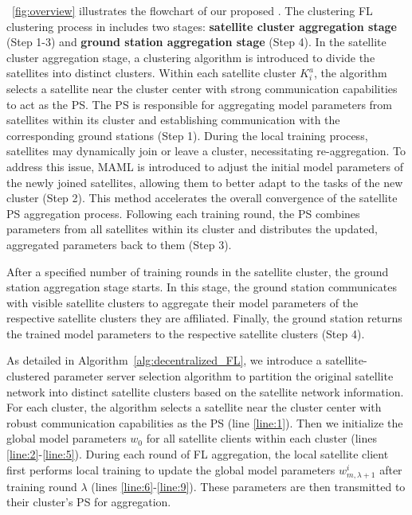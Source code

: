 \figurename~\ref{fig:overview} illustrates the flowchart of our proposed \algname. The clustering FL clustering process in \algname includes two stages: \textbf{satellite cluster aggregation stage} (Step 1-3) and \textbf{ground station aggregation stage} (Step 4). In the satellite cluster aggregation stage, a clustering algorithm is introduced to divide the satellites into distinct clusters. Within each satellite cluster $K_i^a$, the algorithm selects a satellite near the cluster center with strong communication capabilities to act as the PS. The PS is responsible for aggregating model parameters from satellites within its cluster and establishing communication with the corresponding ground stations (Step 1). During the local training process, satellites may dynamically join or leave a cluster, necessitating re-aggregation. To address this issue, MAML is introduced to adjust the initial model parameters of the newly joined satellites, allowing them to better adapt to the tasks of the new cluster (Step 2). This method accelerates the overall convergence of the satellite PS aggregation process. Following each training round, the PS combines parameters from all satellites within its cluster and distributes the updated, aggregated parameters back to them (Step 3).


After a specified number of training rounds in the satellite cluster, the ground station aggregation stage starts. In this stage, the ground station communicates with visible satellite clusters to aggregate their model parameters of the respective satellite clusters they are affiliated. Finally, the ground station returns the trained model parameters to the respective satellite clusters (Step 4).

As detailed in Algorithm~\ref{alg:decentralized_FL},  we introduce a satellite-clustered parameter server selection algorithm to partition the original satellite network into distinct satellite clusters based on the satellite network information. For each cluster, the algorithm selects a satellite near the cluster center with robust communication capabilities as the PS (line \ref{line:1}). Then we initialize the global model parameters $w_0$ for all satellite clients within each cluster (lines \ref{line:2}-\ref{line:5}). During each round of FL aggregation, the local satellite client first performs local training to update the global model parameters $w_{m,\lambda+1}^{i}$ after training round $\lambda$ (lines \ref{line:6}-\ref{line:9}). These parameters are then transmitted to their cluster's PS for aggregation. 

